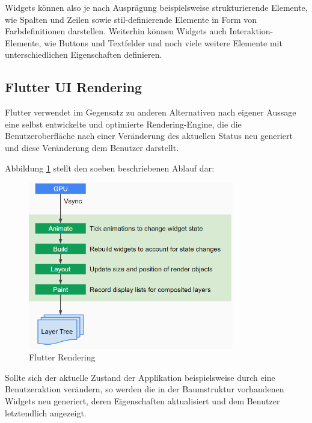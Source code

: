 \documentclass[bibliography=totoc,listof=totoc,BCOR=5mm,DIV=12,oneside]{scrbook}
\begin{document}
\par \bigskip Widgets können also je nach Ausprägung beispielsweise strukturierende Elemente, wie Spalten und Zeilen sowie stil-definierende Elemente in Form von Farbdefinitionen darstellen. Weiterhin können Widgets auch Interaktion-Elemente, wie Buttons und Textfelder und noch viele weitere Elemente mit unterschiedlichen Eigenschaften definieren.

\subsection{Flutter UI Rendering}
\par Flutter verwendet im Gegensatz zu anderen Alternativen nach eigener Aussage eine selbst entwickelte und optimierte Rendering-Engine, die die Benutzeroberfläche nach einer Veränderung des aktuellen Status neu generiert und diese Veränderung dem Benutzer darstellt\citep{Flu3}. 

\par \bigskip Abbildung \ref{img:flutterHighLevelRendering} stellt den soeben beschriebenen Ablauf dar:

\bigskip
\begin{figure}[H]
	\centering
	\includegraphics[width=0.8\textwidth, keepaspectratio]{Bilder/FlutterRendering.png}
	\caption{Flutter Rendering \cite{Flu5}}
	\label{img:flutterHighLevelRendering}
\end{figure}

\par Sollte sich der aktuelle Zustand der Applikation beispielsweise durch eine Benutzeraktion verändern, so werden die in der Baumstruktur vorhandenen Widgets neu generiert, deren Eigenschaften aktualisiert und dem Benutzer letztendlich angezeigt.
\end{document}
